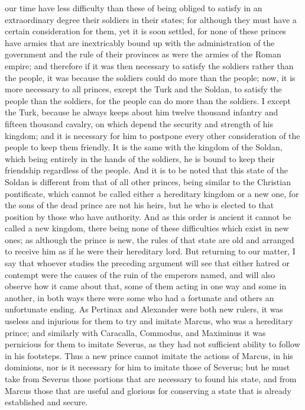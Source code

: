 \documentclass[12pt,letterpaper]{memoir}
\begin{document}
our time have less difficulty than these of being obliged to satisfy in
an extraordinary degree their soldiers in their states; for although
they must have a certain consideration for them, yet it is soon
settled, for none of these princes have armies that are inextricably
bound up with the administration of the government and the rule of
their provinces as were the armies of the Roman empire; and therefore
if it was then necessary to satisfy the soldiers rather than the
people, it was because the soldiers could do more than the people; now,
it is more necessary to all princes, except the Turk and the Soldan,
to satisfy the people than the soldiers, for the people can do more
than the soldiers. I except the Turk, because he always keeps about
him twelve thousand infantry and fifteen thousand cavalry, on which
depend the security and strength of his kingdom; and it is necessary
for him to postpone every other consideration of the people to keep
them friendly. It is the same with the kingdom of the Soldan, which
being entirely in the hands of the soldiers, he is bound to keep their
friendship regardless of the people. And it is to be noted that this
state of the Soldan is different from that of all other princes, being
similar to the Christian pontificate, which cannot be called either
a hereditary kingdom or a new one, for the sons of the dead prince
are not his heirs, but he who is elected to that position by those
who have authority. And as this order is ancient it cannot be called
a new kingdom, there being none of these difficulties which exist in
new ones; as although the prince is new, the rules of that state are
old and arranged to receive him as if he were their hereditary lord.
But returning to our matter, I say that whoever studies the preceding
argument will see that either hatred or contempt were the causes of
the ruin of the emperors named, and will also observe how it came about
that, some of them acting in one way and some in another, in both ways
there were some who had a fortunate and others an unfortunate ending.
As Pertinax and Alexander were both new rulers, it was useless and
injurious for them to try and imitate Marcus, who was a hereditary
prince; and similarly with Caracalla, Commodus, and Maximinus it was
pernicious for them to imitate Severus, as they had not sufficient
ability to follow in his footsteps. Thus a new prince cannot imitate
the actions of Marcus, in his dominions, nor is it necessary for him to
imitate those of Severus; but he must take from Severus those portions
that are necessary to found his state, and from Marcus those that are
useful and glorious for conserving a state that is already established
and secure.
\end{document}
